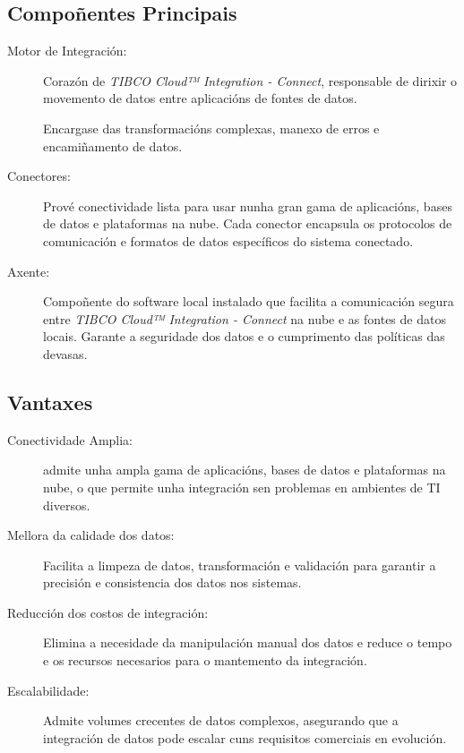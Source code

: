 \subsection{Compoñentes Principais}

\begin{description}
    \item[Motor de Integración:] Corazón de \textit{TIBCO Cloud™ Integration - Connect}, responsable de dirixir o movemento de datos entre aplicacións de fontes de datos.
    
    Encargase das transformacións complexas, manexo de erros e encamiñamento de datos.
    
    \item[Conectores:] Prové conectividade lista para usar nunha gran gama de aplicacións, bases de datos e plataformas na nube. Cada conector encapsula os protocolos de comunicación e formatos de datos específicos do sistema conectado.
    
    \item[Axente:] Compoñente do software local instalado que facilita a comunicación segura entre \textit{TIBCO Cloud™ Integration - Connect} na nube e as fontes de datos locais. Garante a seguridade dos datos e o cumprimento das políticas das devasas.
\end{description}

\subsection{Vantaxes}

\begin{description}
    \item[Conectividade Amplia:] admite unha ampla gama de aplicacións, bases de datos e plataformas na nube, o que permite unha integración sen problemas en ambientes de TI diversos.
    
    \item[Mellora da calidade dos datos:] Facilita a limpeza de datos, transformación e validación para garantir a precisión e consistencia dos datos nos sistemas.
    
    \item[Reducción dos costos de integración:] Elimina a necesidade da manipulación manual dos datos e reduce o tempo e os recursos necesarios para o mantemento da integración.
    
    \item[Escalabilidade:] Admite volumes crecentes de datos complexos, asegurando que a integración de datos pode escalar cuns requisitos comerciais en evolución.
\end{description}
